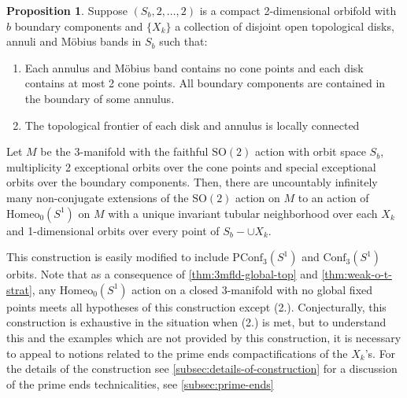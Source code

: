 \documentclass[10pt, oneside]{article}
\newcommand{\SO}[1][2]{\text{SO}(#1)}
\newcommand{\homeo}[1][S^1]{\text{Homeo}_0(#1)}
\newcommand{\conf}[2][S^1]{\text{Conf}_{#2}(#1)}
\newcommand{\pconf}[2][S^1]{\text{PConf}_{#2}(#1)}
\theoremstyle{definition}
\newtheorem{conj}{Conjecture}[section]
\newtheorem{prop}{Proposition}[section]
\theoremstyle{definition}
\begin{document}
\begin{prop}\label{prop:lc-fr-construction}
    Suppose $(S_b, 2, \dots, 2)$ is a compact 2-dimensional orbifold with $b$ boundary  components and $\{X_k\}$ a collection of disjoint open topological disks, annuli and  M\"{o}bius bands in $S_b$ such that:
    \begin{enumerate}
        \item Each annulus and M\"{o}bius band contains no cone points and each disk contains at most 2 cone points. All boundary components are contained in the boundary of some annulus.
        \item The topological frontier of each disk and annulus is locally connected
    \end{enumerate}
    Let $M$ be the 3-manifold with the faithful $\SO$ action with orbit space $S_b$, multiplicity 2 exceptional orbits over the cone points and special exceptional orbits over the boundary components. Then, there are uncountably infinitely many non-conjugate extensions of the $\SO$ action on $M$ to an action of $\homeo$ on $M$ with a unique invariant tubular neighborhood over each $X_k$ and 1-dimensional orbits over every point of $S_b - \cup X_k$.
\end{prop}

This construction is easily modified to include $\pconf[S^1]{3}$ and $\conf[S^1]{3}$ orbits.
Note that as a consequence of \cref{thm:3mfld-global-top} and \cref{thm:weak-o-t-strat}, any $\homeo$ action on a closed 3-manifold with no global fixed points meets all hypotheses of this construction except (2.). Conjecturally, this construction is exhaustive in the situation when (2.) is met, but to understand this and the examples which are not provided by this construction, it is necessary to appeal to notions related to the prime ends compactifications of the $X_k$'s. For the details of the construction see \cref{subsec:details-of-construction} for a discussion of the prime ends technicalities, see \cref{subsec:prime-ends}
\end{document}
